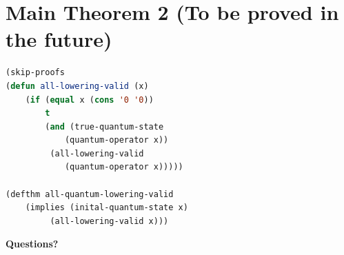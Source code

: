 \documentclass[
paper=128mm:96mm, %
fontsize=11pt, %
pagesize, %
parskip=half-, %
]{scrartcl} %
\theoremstyle{mythmstyle} %
\begin{document}
\clearpage

\section{Main Theorem 2 (To be proved in the future)}

\begin{lstlisting}[language=Lisp,breaklines=true]
(skip-proofs
(defun all-lowering-valid (x)
	(if (equal x (cons '0 '0))
	    t
	    (and (true-quantum-state 
			(quantum-operator x))
		 (all-lowering-valid 
			(quantum-operator x)))))

(defthm all-quantum-lowering-valid 
	(implies (inital-quantum-state x)
		 (all-lowering-valid x)))
\end{lstlisting}

\clearpage

\thispagestyle{empty} %




\clearpage

\thispagestyle{empty} %

\begin{flushright}
\vspace{0.6cm}
\color{white}\sffamily
{\bfseries\LARGE Questions?\par} %
\vfill
\end{flushright}

\end{document}
